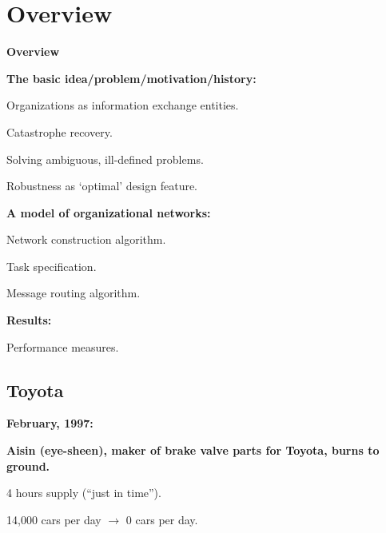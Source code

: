 \section{Overview}

  \textbf{Overview}

  \textbf{The basic idea/problem/motivation/history:}
    
     
      Organizations as information exchange entities.
     
      Catastrophe recovery.
     
      Solving ambiguous, ill-defined problems.
    
      Robustness as `optimal' design feature.
    
  

  \textbf{A model of organizational networks:}
    
    
      Network construction algorithm.
    
      Task specification.
    
      Message routing algorithm.
    
  

  \textbf{Results:}
    
    
      Performance measures.
    
  


\subsection{Toyota}


  \textbf{February, 1997:}

  \textbf{Aisin (eye-sheen), maker of brake valve parts for Toyota, burns to ground.\cite{nishiguchi2000a}}
    
    
      4 hours supply (``just in time'').
    
      14,000 cars per day $\rightarrow$ 0 cars per day.
    
